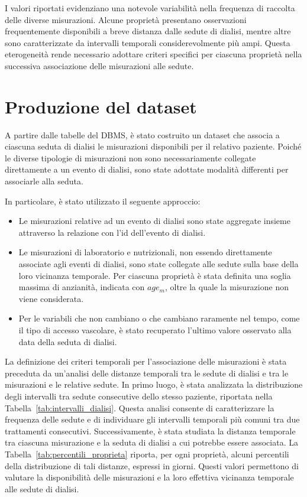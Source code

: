 \documentclass[a4paper,12pt]{report}
\begin{document}
I valori riportati evidenziano una notevole variabilità nella frequenza di raccolta delle diverse misurazioni. Alcune proprietà presentano osservazioni frequentemente disponibili a breve distanza dalle sedute di dialisi, mentre altre sono caratterizzate da intervalli temporali considerevolmente più ampi. Questa eterogeneità rende necessario adottare criteri specifici per ciascuna proprietà nella successiva associazione delle misurazioni alle sedute.

\section{Produzione del dataset}
\label{sec:dataset_production}

A partire dalle tabelle del DBMS, è stato costruito un dataset che associa a ciascuna seduta di dialisi le misurazioni disponibili per il relativo paziente. Poiché le diverse tipologie di misurazioni non sono necessariamente collegate direttamente a un evento di dialisi, sono state adottate modalità differenti per associarle alla seduta.

In particolare, è stato utilizzato il seguente approccio:

\begin{itemize}
    \item Le misurazioni relative ad un evento di dialisi sono state aggregate insieme attraverso la relazione con l'id dell'evento di dialisi.
    \item Le misurazioni di laboratorio e nutrizionali, non essendo direttamente associate agli eventi di dialisi, sono state collegate alle sedute sulla base della loro vicinanza temporale. Per ciascuna proprietà è stata definita una soglia massima di anzianità, indicata con \(age_m\), oltre la quale la misurazione non viene considerata.
    \item Per le variabili che non cambiano o che cambiano raramente nel tempo, come il tipo di accesso vascolare, è stato recuperato l'ultimo valore osservato alla data della seduta di dialisi.
\end{itemize}

La definizione dei criteri temporali per l'associazione delle misurazioni è stata preceduta da un'analisi delle distanze temporali tra le sedute di dialisi e tra le misurazioni e le relative sedute. In primo luogo, è stata analizzata la distribuzione degli intervalli tra sedute consecutive dello stesso paziente, riportata nella Tabella~\ref{tab:intervalli_dialisi}. Questa analisi consente di caratterizzare la frequenza delle sedute e di individuare gli intervalli temporali più comuni tra due trattamenti consecutivi. Successivamente, è stata studiata la distanza temporale tra ciascuna misurazione e la seduta di dialisi a cui potrebbe essere associata. La Tabella~\ref{tab:percentili_proprieta} riporta, per ogni proprietà, alcuni percentili della distribuzione di tali distanze, espressi in giorni. Questi valori permettono di valutare la disponibilità delle misurazioni e la loro effettiva vicinanza temporale alle sedute di dialisi.
\end{document}
